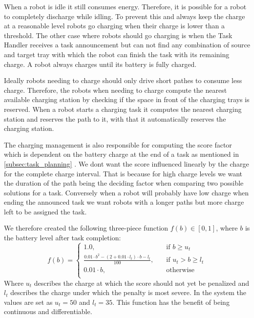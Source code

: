 \documentclass[journal]{IEEEtran}
\newcommand{\compref}[1]{\autoref{#1} \nameref{#1}}
\begin{document}
When a robot is idle it still consumes energy. Therefore, it is possible for a robot to completely discharge while idling. 
To prevent this and always keep the charge at a reasonable level robots go charging when their charge is lower than a threshold.
The other case where robots should go charging is when the Task Handler receives a task announcement but can not find any combination of source and target tray with which the robot can finish the task with its remaining charge.
A robot always charges until its battery is fully charged.

Ideally robots needing to charge should only drive short pathes to consume less charge. 
Therefore, the robots when needing to charge compute the nearest available charging station by checking if the space in front of the charging trays is reserved.
When a robot starts a charging task it computes the nearest charging station and reserves the path to it, with that it automatically reserves the charging station.

The charging management is also responsible for computing the score factor which is dependent on the battery charge at the end of a task as mentioned in \compref{subsec:task_planning}.
We dont want the score influenced linearly by the charge for the complete charge interval. 
That is because for high charge levels we want the duration of the path being the deciding factor when comparing two possible solutions for a task.
Conversely when a robot will probably have low charge when ending the announced task we want robots with a longer paths but more charge left to be assigned the task.

We therefore created the following three-piece function $f(b) \in [0, 1]$, where $b$ is the battery level after task completion:
\[ 
f(b) = 
	\begin{cases}
		1.0,&\quad \text{if } b \geq u_t \\
		\frac{0.01 \cdot b^2 - (2 + 0.01 \cdot l_t) \cdot b - l_t}{100}, &\quad \text{if } u_t > b \geq l_t \\
		0.01 \cdot b, &\quad \text{otherwise} \\
	\end{cases}
\]
Where $u_t$ describes the charge at which the score should not yet be penalized and $l_t$ describes the charge under which the penalty is most severe.
In the system the values are set as $u_t = 50$ and $l_t = 35$.
This function has the benefit of being continuous and differentiable.
\end{document}
